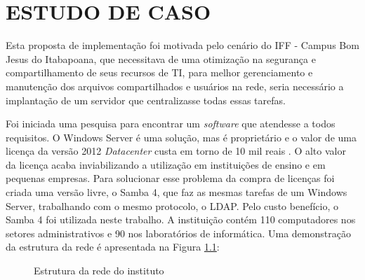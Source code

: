 \chapter{ESTUDO DE CASO}

Esta proposta de implementação foi motivada pelo cenário do IFF - Campus Bom Jesus do Itabapoana, que necessitava de uma otimização na segurança e compartilhamento de seus recursos de TI, para melhor gerenciamento e manutenção dos arquivos compartilhados e usuários na rede, seria necessário a implantação de um servidor que centralizasse todas essas tarefas.

Foi iniciada uma pesquisa para encontrar um \textit{software} que atendesse a todos requisitos. O Windows Server é uma solução, mas é proprietário e o valor de uma licença da versão 2012 \textit{Datacenter} custa em torno de 10 mil reais \cite{SERVER}. O alto valor da licença acaba inviabilizando a utilização em instituições de ensino e em pequenas empresas. 
Para solucionar esse problema da compra de licenças foi criada uma versão livre, o Samba 4, que faz as mesmas tarefas de um Windows Server, trabalhando com o mesmo protocolo, o LDAP. Pelo custo benefício, o Samba 4 foi utilizada neste trabalho.
A instituição contém 110 computadores nos setores administrativos e 90 nos laboratórios de informática. Uma demonstração da estrutura da rede é apresentada na Figura \ref{rede}:

\begin{figure}[h!]
   	\centering
   	\caption{Estrutura da rede do instituto}
    \label{rede}
\end{figure}

